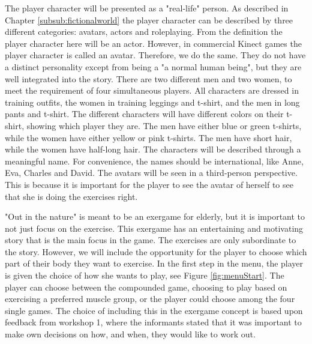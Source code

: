The player character will be presented as a "real-life" person.  As described in Chapter \ref{subsub:fictionalworld} the player character can be described by three different categories: avatars, actors and roleplaying. From the definition the player character here will be an actor. However, in commercial Kinect games the player character is called an avatar. Therefore, we do the same. They do not have a distinct personality except from being a "a normal human being", but they are well integrated into the story. There are two different men and two women, to meet the requirement of four simultaneous players. All characters are dressed in training outfits, the women in training leggings and t-shirt, and the men in long pants and t-shirt. The different characters will have different colors on their t-shirt, showing which player they are. The men have either blue or green t-shirts, while the women have either yellow or pink t-shirts. The men have short hair, while the women have half-long hair. The characters will be described through a meaningful name. For convenience, the names should be international, like Anne, Eva, Charles and David. The avatars will be seen in a third-person perspective. This is because it is important for the player to see the avatar of herself to see that she is doing the exercises right. 

"Out in the nature" is meant to be an exergame for elderly, but it is important to not just focus on the exercise. This exergame has an entertaining and motivating story that is the main focus in the game. The exercises are only subordinate to the story. However, we will include the opportunity for the player to choose which part of their body they want to exercise. In the first step in the menu, the player is given the choice of how she wants to play, see Figure \ref{fig:menuStart}. The player can choose between the compounded game, choosing to play based on exercising a preferred muscle group, or the player could choose among the four single games. The choice of including this in the exergame concept is based upon feedback from workshop 1, where the informants stated that it was important to make own decisions on how, and when, they would like to work out.                     

